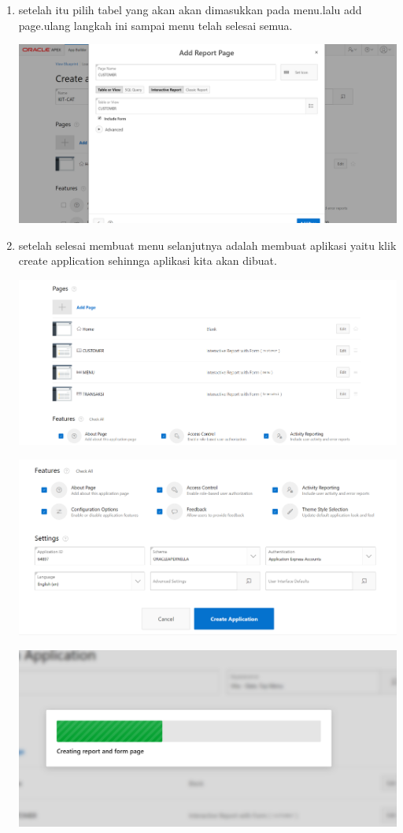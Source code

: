 \documentclass[a4paper, 12pt]{article}
\begin{document}
\begin{enumerate}
\begin{center}
\end{center}
\item setelah itu pilih tabel yang akan akan dimasukkan pada menu.lalu add page.ulang langkah ini sampai menu telah selesai semua.
\begin{center}
    \includegraphics[width=.8\textwidth]{figure/5.PNG}
\end{center}
\item setelah selesai membuat menu selanjutnya adalah membuat aplikasi yaitu klik create application sehinnga aplikasi kita akan dibuat.
\begin{center}
    \includegraphics[width=.8\textwidth]{figure/6.PNG}
\end{center}
\begin{center}
    \includegraphics[width=.8\textwidth]{figure/7.PNG}
\end{center}
\begin{center}
    \includegraphics[width=.8\textwidth]{figure/8.PNG}

\end{center}
\end{enumerate}
\end{document}
